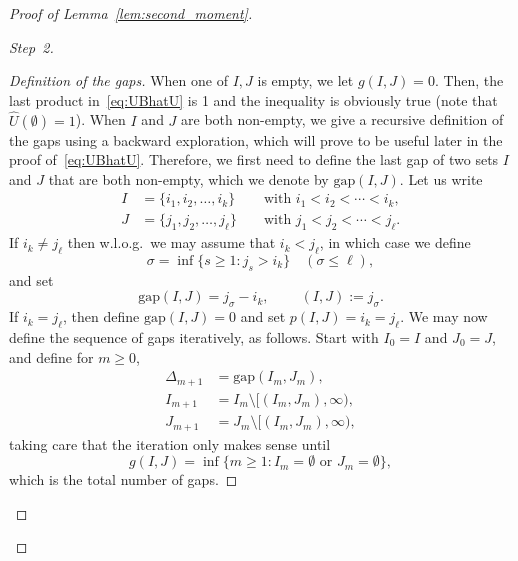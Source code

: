 \documentclass[10pt]{amsart}
\theoremstyle{definition}\newtheorem{defi}[theo]{Definition}\newtheorem{rema}[theo]{Remark}\newtheorem{exam}[theo]{Example}\newtheorem{exem}[theo]{Example}\newtheorem{nota}[theo]{Notation}
\newcommand{\gD}{\Delta}
\newcommand{\gs}{\sigma}
\newcommand{\hU}{\hat U}
\newcommand{\gap}{{\mathrm{gap}}}
\newenvironment{step}[1]{\begin{proof}[{#1}]}{\let\qed\relax \end{proof}}
\begin{document}
\begin{proof}[Proof of Lemma~\ref{lem:second_moment}]
\begin{step}{Step~2}
\begin{step}{Definition of the gaps}
When one of $I, J$ is empty, we let $g(I, J)=0$. Then, the last product in~\eqref{eq:UBhatU} is 1 and the inequality is obviously true (note that $\hU(\emptyset) = 1$). When $I$ and $J$ are both non-empty, we give a recursive definition of the gaps using a backward exploration, which will prove to be useful later in the proof of~\eqref{eq:UBhatU}. Therefore, we first need to define the last gap of two sets $I$ and $J$ that are both non-empty, which we denote by $\gap(I,J)$. Let us write
\begin{equation}
\begin{aligned}
I &= \{i_1, i_2, \ldots, i_k\} &&\text{ with } i_1 < i_2 < \cdots < i_k,\\
J &= \{j_1, j_2, \ldots, j_\ell\} &&\text{ with } j_1 < j_2 < \cdots < j_\ell.
\end{aligned}
\end{equation}
If $i_k \neq j_\ell$ then w.l.o.g.~we may assume that $i_k < j_\ell$, in which case we define
\begin{equation}
\gs = \inf\{s \geq 1 \colon j_s > i_k\} \quad (\gs \leq \ell),
\end{equation}
and set
\begin{equation}
\gap(I,J) = j_\gs - i_k, \qquad~(I,J) := j_\gs.
\end{equation}
If $i_k = j_\ell$, then define $\gap(I,J) = 0$ and set $p(I,J) = i_k = j_\ell$. We may now define the sequence of gaps iteratively, as follows. Start with $I_0 = I$ and $J_0 = J$, and define for $m \geq 0$,
\begin{equation}\label{eq:defgaps}
\begin{aligned}
\gD_{m+1} &= \gap(I_m, J_m),\\
I_{m+1} &= I_m \setminus [(I_m,J_m),\infty),\\
J_{m+1} &= J_m \setminus [(I_m,J_m),\infty),
\end{aligned}
\end{equation}
taking care that the iteration only makes sense until
\begin{equation}\label{eq:totalgap}
g(I,J) = \inf\{m \geq 1 \colon I_{m} = \emptyset \text{ or } J_{m} = \emptyset\},
\end{equation}
which is the total number of gaps.
\end{step}


\end{step}
\end{proof}
\end{document}
